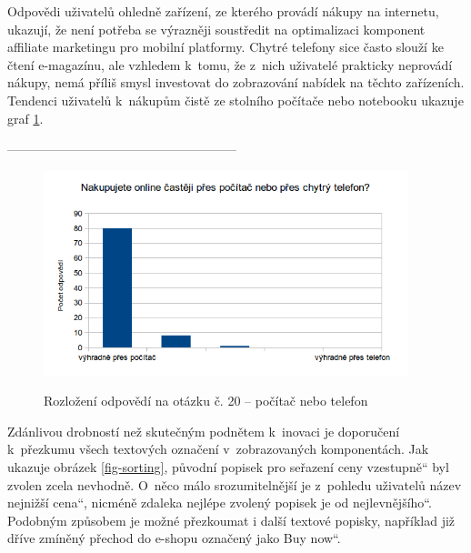 \documentclass[12pt,twoside,openany]{fithesis}
\begin{document}
                          Odpovědi uživatelů ohledně zařízení, ze 
kterého provádí nákupy na internetu, ukazují, že není potřeba se 
výrazněji soustředit na optimalizaci komponent affiliate marketingu pro 
mobilní platformy. Chytré telefony sice často slouží ke čtení 
e-magazínu, ale vzhledem k~tomu, že z~nich uživatelé prakticky neprovádí 
nákupy, nemá příliš smysl investovat do zobrazování nabídek na těchto 
zařízeních. Tendenci uživatelů k~nákupům čistě ze stolního 
počítače nebo notebooku ukazuje graf 
\hyperlink{fig-smartphone}{{\ref{fig-smartphone}}}.

------------------------------------------------------
                          \begin{figure}[hbt]
                              \hypertarget{fig-smartphone}{}%
                              \begin{center}

                                  
{{\includegraphics[width=400px]{img/pc-telefon}}\hypertarget{idp55147024}{}%
                                      \label{idp55147024}
                                  }
                                  {{\caption[{Rozložení odpovědí na otázku 
č. 20 -- počítač nebo telefon}]{{{Rozložení odpovědí na otázku č. 20 
-- počítač nebo telefon}}}\label{fig-smartphone}}}
                              \end{center}
                          \end{figure}

                          Zdánlivou drobností než skutečným podnětem 
k~inovaci je doporučení k~přezkumu všech textových označení 
v~zobrazovaných komponentách. Jak ukazuje obrázek 
\hyperlink{fig-sorting}{{\ref{fig-sorting}}}, původní popisek pro seřazení 
ceny \glqq vzestupně\textquotedblleft{} byl zvolen zcela nevhodně. O~něco 
málo srozumitelnější je z~pohledu uživatelů název \glqq nejnižší 
cena\textquotedblleft{}, nicméně zdaleka nejlépe zvolený popisek je \glqq 
od nejlevnějšího\textquotedblleft{}. Podobným způsobem je možné 
přezkoumat i další textové popisky, například již dříve zmíněný 
přechod do e-shopu označený jako \glqq Buy now\textquotedblleft{}.
\end{document}
